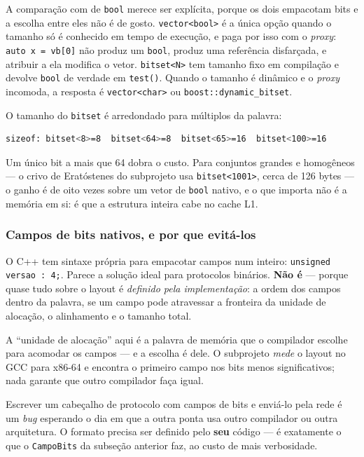 A comparação com  de \texttt{bool} merece ser explícita,
porque os dois empacotam bits e a escolha entre eles não é de gosto.
\texttt{vector<bool>} é a única opção quando o tamanho só é conhecido em tempo
de execução, e paga por isso com o \emph{proxy}: \texttt{auto x = vb[0]} não
produz um \texttt{bool}, produz uma referência disfarçada, e atribuir a ela
modifica o vetor. \texttt{bitset<N>} tem tamanho fixo em compilação e devolve
\texttt{bool} de verdade em \texttt{test()}. Quando o tamanho é dinâmico e o
\emph{proxy} incomoda, a resposta é \texttt{vector<char>} ou
\texttt{boost::dynamic\_bitset}.

O tamanho do \texttt{bitset} é arredondado para múltiplos da palavra:

\begin{lstlisting}[style=bt, language=bash,
    caption={Saída de \texttt{src/bits/}: o arredondamento para a palavra.}]
sizeof: bitset<8>=8  bitset<64>=8  bitset<65>=16  bitset<100>=16
\end{lstlisting}

Um único bit a mais que 64 dobra o custo. Para conjuntos grandes e homogêneos
--- o crivo de Eratóstenes do subprojeto usa \texttt{bitset<1001>}, cerca de 126
bytes --- o ganho é de oito vezes sobre um vetor de \texttt{bool} nativo, e o
que importa não é a memória em si: é que a estrutura inteira cabe no cache L1.

\subsubsection{Campos de bits nativos, e por que evitá-los}

O C++ tem sintaxe própria para empacotar campos num inteiro:
\texttt{unsigned versao : 4;}. Parece a solução ideal para protocolos binários.
\textbf{Não é} --- porque quase tudo sobre o layout é \emph{definido pela
implementação}: a ordem dos campos dentro da palavra, se um campo pode
atravessar a fronteira da unidade de alocação, o alinhamento e o tamanho total.

A ``unidade de alocação'' aqui é a palavra de memória que o compilador escolhe
para acomodar os campos --- e a escolha é dele. O subprojeto \emph{mede} o
layout no GCC para x86-64 e encontra o primeiro campo nos bits menos
significativos; nada garante que outro compilador faça igual.

\begin{armadilha}
Escrever um cabeçalho de protocolo com campos de bits e enviá-lo pela rede é um
\emph{bug} esperando o dia em que a outra ponta usa outro compilador ou outra
arquitetura. O formato precisa ser definido pelo \textbf{seu} código --- é
exatamente o que o \texttt{CampoBits} da subseção anterior faz, ao custo de mais
verbosidade.
\end{armadilha}

